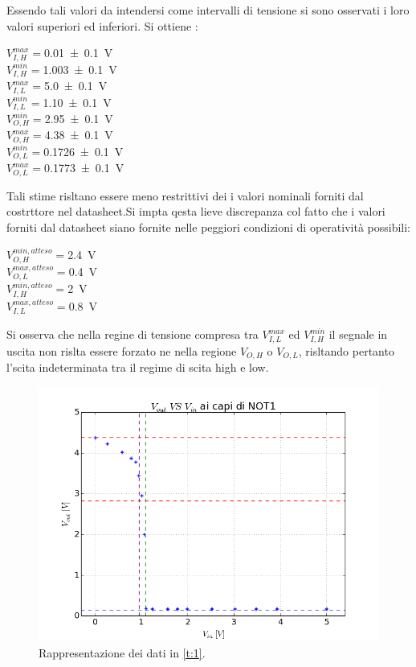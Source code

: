 	 Essendo tali valori da intendersi come intervalli di tensione si sono osservati i loro valori superiori ed inferiori.
	 Si ottiene :
	 \begin{center}
	 $V_{I,H}^{max}=$\SI{0.01 \pm 0.1}{\volt} \\
	 $V_{I,H}^{min}=$\SI{1.003 \pm 0.1}{\volt}\\
	 $V_{I,L}^{max}=$\SI{5.0 \pm 0.1}{\volt}\\
	 $V_{I,L}^{min}=$\SI{1.10 \pm 0.1}{\volt}\\
	 
	 $V_{O,H}^{min}=$\SI{2.95 \pm 0.1}{\volt}\\
	 $V_{O,H}^{max}=$\SI{4.38 \pm 0.1}{\volt}\\
	 $V_{O,L}^{min}=$\SI{0.1726 \pm 0.1}{\volt}\\
	 $V_{O,L}^{max}=$\SI{0.1773 \pm 0.1}{\volt}	\\
	 \end{center}
	 
	 Tali stime risltano essere meno restrittivi dei i valori
	 nominali forniti dal costrttore nel datasheet.Si impta qesta lieve discrepanza 
	 col fatto che i valori forniti dal datasheet siano fornite nelle peggiori condizioni di operatività possibili:
	 \begin{center}
	 
	 	$V_{O,H}^{min,atteso}=$\SI{2.4}{\volt}\\
	 	$V_{O,L}^{max,atteso}=$\SI{0.4}{\volt}\\
	 $V_{I,H}^{min,atteso}=$\SI{2}{\volt}\\
	 $V_{I,L}^{max,atteso}=$\SI{0.8}{\volt}\\
 \end{center}
	 Si osserva che nella regine di tensione compresa tra 	$V_{I,L}^{max}$ ed $V_{I,H}^{min}$ il segnale in uscita non rislta essere forzato ne nella regione $V_{O,H}$ o $V_{O,L}$, risltando pertanto  l'scita indeterminata tra il regime di scita high e low.
	\begin{center}
		\begin{figure}[h]
			\includegraphics[scale=0.50]{../immagine/in-ot.png}
			\caption{Rappresentazione dei dati in \tablename{ \ref{t:1}}.}
			\label{f:i1}
		\end{figure}
	\end{center}
